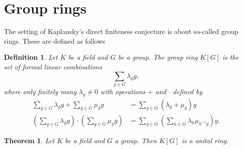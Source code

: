 \documentclass[titlepage, a4paper]{article}
\newtheorem{theorem}{Theorem}
\newtheorem{definition}{Definition}
\theoremstyle{remark}
\begin{document}
\section{Group rings}\label{sec:group_rings}

The setting of Kaplansky's direct finiteness conjecture is about so-called group rings. These are defined as follows


\begin{definition}\label{def:group_ring}
    Let $K$ be a field and $G$ be a group. The group ring $K[G]$ is the set of formal linear combinations
    \[
        \sum_{g \in G} \lambda_g g,
    \]
    where only finitely many $\lambda_g \neq 0$ with operations $+$ and $\cdot$ defined by
    \begin{align*}
        \sum_{g \in G} \lambda_g g + \sum_{g \in G} \mu_g g
        &= \sum_{g \in G} (\lambda_g+\mu_g) g \\
        \left(\sum_{g \in G} \lambda_g g \right) \cdot \left(\sum_{g \in G} \mu_g g \right)
        &= \sum_{g \in G} \left( \sum_{h \in G} \lambda_{h} \mu_{h^{-1}g} \right) g.
    \end{align*}
\end{definition}


\begin{theorem}
    Let $K$ be a field and $G$ a group. Then $K[G]$ is a unital ring.
\end{theorem}
\end{document}
